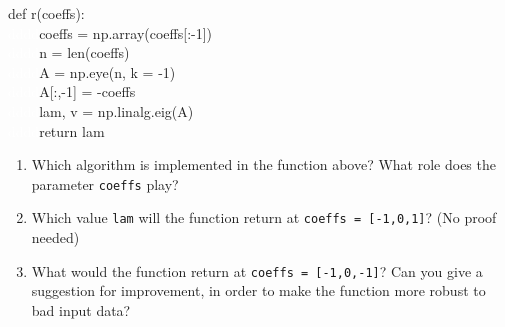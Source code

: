 def r(coeffs):\\
\textcolor{white}{dddd}coeffs = np.array(coeffs[:-1])\\
\textcolor{white}{dddd}n = len(coeffs)\\
\textcolor{white}{dddd}A = np.eye(n, k = -1)\\
\textcolor{white}{dddd}A[:,-1] = -coeffs\\
\textcolor{white}{dddd}lam, v = np.linalg.eig(A)\\
\textcolor{white}{dddd}return lam\\
\begin{enumerate}
	\item Which algorithm is implemented in the function above? What role does the parameter \verb|coeffs| play?
	\item Which value \verb|lam| will the function return at \verb|coeffs = [-1,0,1]|? (No proof needed)
	\item What would the function return at \verb|coeffs = [-1,0,-1]|? Can you give a suggestion for improvement, in order to make
	the function more robust to bad input data? 
\end{enumerate}